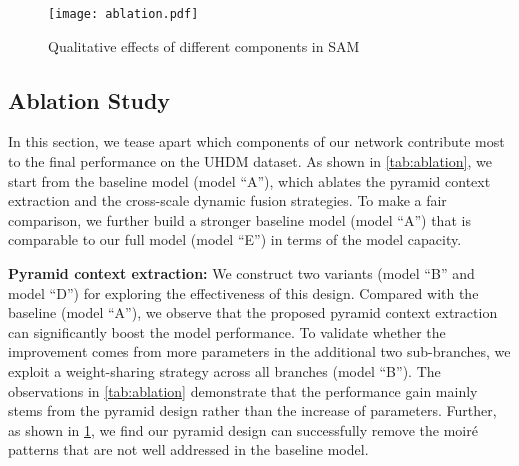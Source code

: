 \documentclass[runningheads]{llncs}
\begin{document}
 
\begin{table*}[t]
    \caption{Ablation study of the proposed SAM. ``A'' represents the baseline model. ``A'' denotes a stronger baseline which is of similar model capacity compared to our full model ``E''. ``B'' adds the pyramid context extraction with shared weights across all branches to ``A'' while ``D'' adopts adaptive weights. ``C'' and ``E'' add the cross-scale dynamic fusion based on ``B'' and ``D'', respectively}
   \centering
   \renewcommand\tabcolsep{5.0pt}
\label{tab:ablation}
\end{table*} 

\begin{figure}[t]\centering
    \texttt{[image: ablation.pdf]}
    \caption{Qualitative effects of different components in SAM}
    \label{fig:ab} 
\end{figure} 

\subsection{Ablation Study}
In this section, we tease apart which components of our network contribute most to the final performance on the UHDM dataset. As shown in \cref{tab:ablation}, we start from the baseline model (model ``A''), which ablates the pyramid context extraction and the cross-scale dynamic fusion strategies. To make a fair comparison, we further build a stronger baseline model (model ``A'') that is comparable to our full model (model ``E'') in terms of the model capacity.

\noindent\textbf{Pyramid context extraction:}
We construct two variants (model ``B'' and model ``D'') for exploring the effectiveness of this design. Compared with the baseline (model ``A''), we observe that the proposed pyramid context extraction can significantly boost the model performance. To validate whether the improvement comes from more parameters in the additional two sub-branches, we exploit a weight-sharing strategy across all branches (model ``B''). The observations in \cref{tab:ablation} demonstrate that the performance gain mainly stems from the pyramid design rather than the increase of parameters. 
Further, as shown in \cref{fig:ab}, we find our pyramid design can successfully remove the moiré patterns that are not well addressed in the baseline model.
\end{document}
